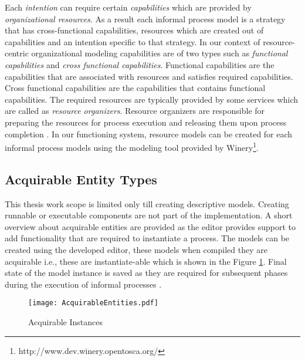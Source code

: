 Each \textit{intention} can require certain \textit{capabilities} which are provided by \textit{organizational resources}. 
As a result each informal process model is a strategy that has cross-functional capabilities, resources which are created out of capabilities and an intention specific to that strategy. In our context of resource-centric organizational modeling capabilities are of two types such as \textit{functional capabilities} and \textit{cross functional capabilities}. Functional capabilities are the capabilities that are associated with resources and satisfies required capabilities. Cross functional capabilities are the capabilities that contains functional capabilities. The required resources are typically provided by some services which are called as \textit{resource organizers}. Resource organizers are responsible for preparing the resources for process execution and releasing them upon process completion \cite{Sungur2014a}. In our functioning system, resource models can be created for each informal process models using the modeling tool provided by Winery\footnote{http://www.dev.winery.opentosca.org/}. 

\subsection{Acquirable Entity Types}
\label{sec:acquirableentities}
This thesis work scope is limited only till creating descriptive models. Creating runnable or executable components are not part of the implementation. A short overview about acquirable entities are provided as the editor provides support to add functionality that are required to instantiate a process. The models can be created using the developed editor, these models when compiled they are acquirable i.e., these are instantiate-able which is shown in the Figure \ref{fig:acquirableentities}. Final state of the model instance is saved as they are required for subsequent phases during the execution of informal processes \cite{Sungur2015}. 

\begin{figure}
	\centering
	\texttt{[image: AcquirableEntities.pdf]}
	\caption{Acquirable Instances}
	\label{fig:acquirableentities}
\end{figure}

